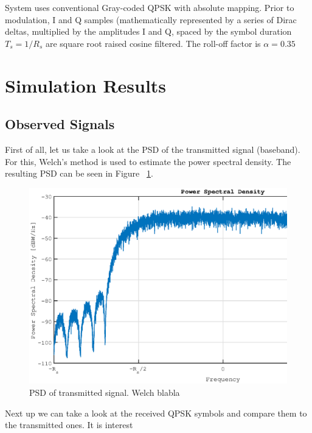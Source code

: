 \documentclass[paper=a4, fontsize=11pt]{scrartcl}	%
\numberwithin{equation}{section}		%
\numberwithin{figure}{section}			%
\numberwithin{table}{section}			%
\begin{document}
System uses conventional Gray-coded QPSK with absolute mapping. Prior to modulation, I and Q samples  (mathematically represented by a series of Dirac deltas, multiplied by the amplitudes I and Q, spaced by the symbol duration $T_s=1/R_s$ are square root raised cosine filtered. The roll-off factor is $\alpha=0.35$

\section{Simulation Results}

\subsection{Observed Signals}

First of all, let us take a look at the PSD of the transmitted signal (baseband). For this, Welch's method is used to estimate the power spectral density. The resulting PSD can be seen in Figure ~\ref{fig:TxPsd}.

\begin{figure}[htb]
\centering
\includegraphics[scale=0.50]{matp_TxPsd.eps}
\caption{PSD of transmitted signal. Welch blabla}\label{fig:TxPsd}
\end{figure}

Next up we can take a look at the received QPSK symbols and compare them to the transmitted ones. It is interest
\end{document}
